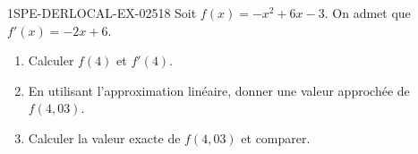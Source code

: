 \begin{exercice}{1SPE-DERLOCAL-EX-025}{1}{8}
Soit $f(x)=-x^2+6x-3$. On admet que $f'(x)=-2x+6$.

\begin{enumerate}
  \item Calculer $f(4)$ et $f'(4)$.
  \item En utilisant l'approximation linéaire, donner une valeur approchée de $f(4{,}03)$.
  \item Calculer la valeur exacte de $f(4{,}03)$ et comparer.
\end{enumerate}
\end{exercice}

